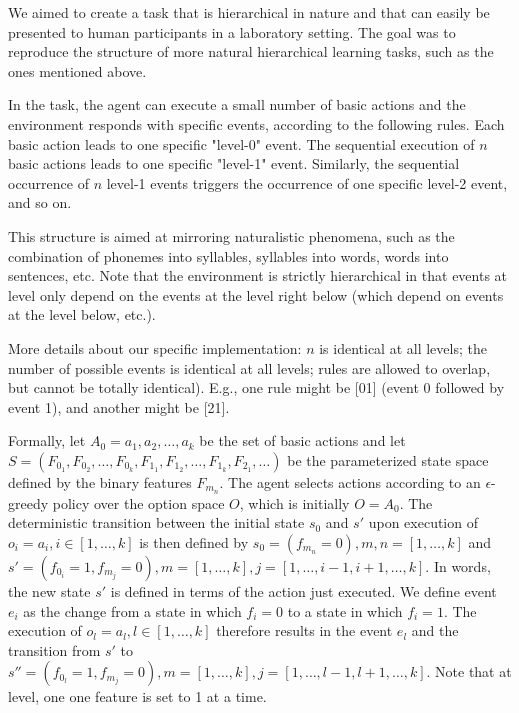 \documentclass{article}
\begin{document}
We aimed to create a task that is hierarchical in nature and that can easily be presented to human participants in a laboratory setting. The goal was to reproduce the structure of more natural hierarchical learning tasks, such as the ones mentioned above. 

In the task, the agent can execute a small number of basic actions and the environment responds with specific events, according to the following rules. Each basic action leads to one specific "level-0" event. The sequential execution of $n$ basic actions leads to one specific "level-1" event. Similarly, the sequential occurrence of $n$ level-1 events triggers the occurrence of one specific level-2 event, and so on. 

This structure is aimed at mirroring naturalistic phenomena, such as the combination of phonemes into syllables, syllables into words, words into sentences, etc. Note that the environment is strictly hierarchical in that events at level only depend on the events at the level right below (which depend on events at the level below, etc.).

More details about our specific implementation: $n$ is identical at all levels; the number of possible events is identical at all levels; rules are allowed to overlap, but cannot be totally identical). E.g., one rule might be [01] (event 0 followed by event 1), and another might be [21].

Formally, let $A_0 = a_1, a_2, \ldots, a_k$ be the set of basic actions and let $S = (F_{0_1}, F_{0_2}, \ldots, F_{0_k}, F_{1_1}, F_{1_2}, \ldots, F_{1_k}, F_{2_1}, \ldots)$ be the parameterized state space defined by the binary features $F_{m_n}$. The agent selects actions according to an $\epsilon$-greedy policy over the option space $O$, which is initially $O = A_0$. The deterministic transition between the initial state $s_0$ and $s'$ upon execution of $o_i = a_i, i \in [1, \ldots, k]$ is then defined by $s_0 = (f_{m_n} = 0), m, n = [1, \ldots, k]$ and $s' = (f_{0_i} = 1, f_{m_j} = 0), m = [1, \ldots, k], j = [1, \ldots, i-1, i+1, \ldots, k]$. In words, the new state $s'$ is defined in terms of the action just executed. We define event $e_i$ as the change from a state in which $f_i = 0$ to a state in which $f_i = 1$. The execution of $o_l = a_l, l \in [1, \ldots, k]$ therefore results in the event $e_l$ and the transition from $s'$ to $s'' = (f_{0_l} = 1, f_{m_j} = 0), m = [1, \ldots, k], j = [1, \ldots, l-1, l+1, \ldots, k]$. Note that at level, one one feature is set to 1 at a time. 
\end{document}
